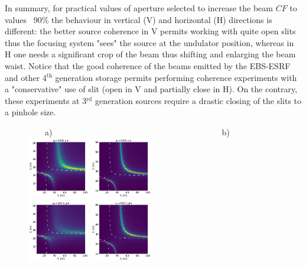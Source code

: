 \documentclass[doublecol]{epl2}
\begin{document}
In summary, for practical values of aperture selected to increase the beam $CF$ to values ~90\% the behaviour in vertical (V) and horizontal (H) directions is different: the better source coherence in V permits working with quite open slits thus the focusing system "sees" the source at the undulator position, whereas in H one needs a significant crop of the beam thus shifting and enlarging the beam waist. Notice that the good coherence of the beams emitted by the EBS-ESRF and other 4$^{\text{th}}$ generation storage permits performing coherence experiments with a "conservative" use of slit (open in V and partially close in H). On the contrary, these experiments at 3$^{\text{rd}}$ generation sources require a drastic closing of the slits to a pinhole size.      

\begin{figure}[htbp]
~~~~a)~~~~~~~~~~~~~~~~~~~~~~~~~~~~~~~~~~~~~~~~~b) \\
\hspace{-1.1cm}
\includegraphics[width=0.24\textwidth]{H_3.png}
\includegraphics[width=0.24\textwidth]{V_3.png}\\
\includegraphics[width=0.24\textwidth]{H_2.png}
\includegraphics[width=0.24\textwidth]{V_2.png}\\

\end{figure}
\end{document}
